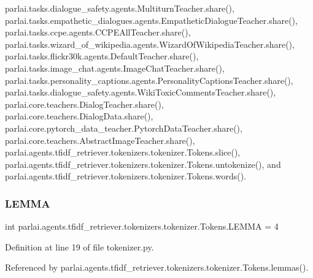 parlai.\+tasks.\+dialogue\+\_\+safety.\+agents.\+Multiturn\+Teacher.\+share(), parlai.\+tasks.\+empathetic\+\_\+dialogues.\+agents.\+Empathetic\+Dialogue\+Teacher.\+share(), parlai.\+tasks.\+ccpe.\+agents.\+C\+C\+P\+E\+All\+Teacher.\+share(), parlai.\+tasks.\+wizard\+\_\+of\+\_\+wikipedia.\+agents.\+Wizard\+Of\+Wikipedia\+Teacher.\+share(), parlai.\+tasks.\+flickr30k.\+agents.\+Default\+Teacher.\+share(), parlai.\+tasks.\+image\+\_\+chat.\+agents.\+Image\+Chat\+Teacher.\+share(), parlai.\+tasks.\+personality\+\_\+captions.\+agents.\+Personality\+Captions\+Teacher.\+share(), parlai.\+tasks.\+dialogue\+\_\+safety.\+agents.\+Wiki\+Toxic\+Comments\+Teacher.\+share(), parlai.\+core.\+teachers.\+Dialog\+Teacher.\+share(), parlai.\+core.\+teachers.\+Dialog\+Data.\+share(), parlai.\+core.\+pytorch\+\_\+data\+\_\+teacher.\+Pytorch\+Data\+Teacher.\+share(), parlai.\+core.\+teachers.\+Abstract\+Image\+Teacher.\+share(), parlai.\+agents.\+tfidf\+\_\+retriever.\+tokenizers.\+tokenizer.\+Tokens.\+slice(), parlai.\+agents.\+tfidf\+\_\+retriever.\+tokenizers.\+tokenizer.\+Tokens.\+untokenize(), and parlai.\+agents.\+tfidf\+\_\+retriever.\+tokenizers.\+tokenizer.\+Tokens.\+words().

\mbox{\label{classparlai_1_1agents_1_1tfidf__retriever_1_1tokenizers_1_1tokenizer_1_1Tokens_a0edd5b712de93117c645a869bda3206a}} 
\subsubsection{\texorpdfstring{L\+E\+M\+MA}{LEMMA}}
{\footnotesize\ttfamily int parlai.\+agents.\+tfidf\+\_\+retriever.\+tokenizers.\+tokenizer.\+Tokens.\+L\+E\+M\+MA = 4\hspace{0.3cm}{\ttfamily [static]}}



Definition at line 19 of file tokenizer.\+py.



Referenced by parlai.\+agents.\+tfidf\+\_\+retriever.\+tokenizers.\+tokenizer.\+Tokens.\+lemmas().

